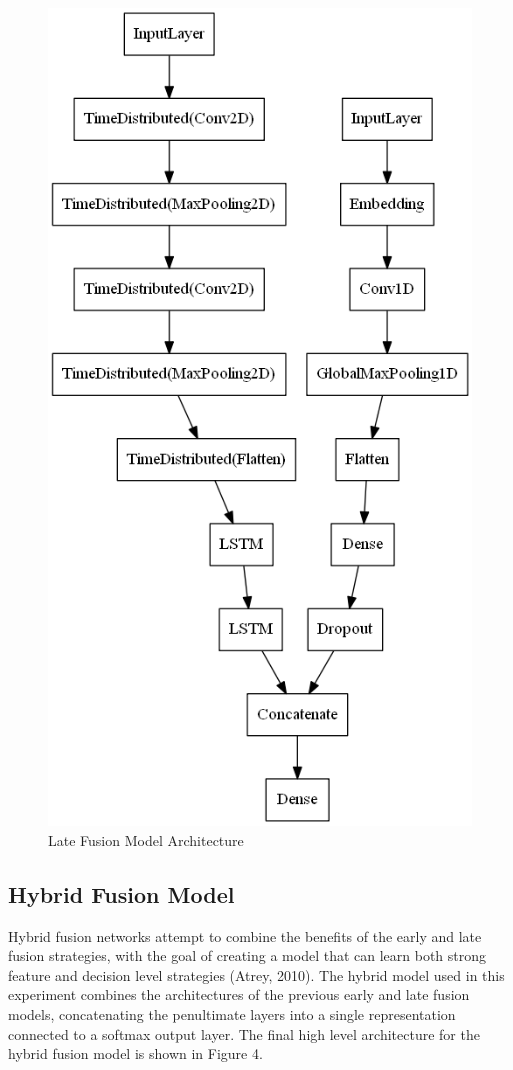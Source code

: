 \documentclass[a4paper,12pt]{article}
\begin{document}
\begin{figure}[H]
\caption{Late Fusion Model Architecture}
\includegraphics[scale=0.35]{late_fusion_model.png}
\centering
\end{figure}

\subsection{Hybrid Fusion Model}
Hybrid fusion networks attempt to combine the benefits of the early and late fusion strategies, with the goal of creating a model that can learn both strong feature and decision level strategies (Atrey, 2010). The hybrid model used in this experiment combines the architectures of the previous early and late fusion models, concatenating the penultimate layers into a single representation connected to a softmax output layer. The final high level architecture for the hybrid fusion model is shown in Figure 4.\\
\end{document}
